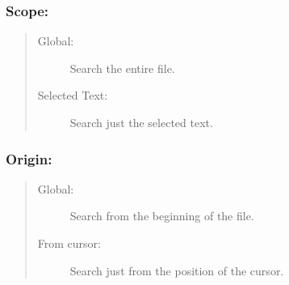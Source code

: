 \subsubsection{Scope:}
\begin{quote}
  \begin{footnotesize}
    \begin{description}
      \item[Global:]
        Search the entire file.
      \item[Selected Text:]
        Search just the selected text.
    \end{description}
  \end{footnotesize}
\end{quote}


\subsubsection{Origin:}
\begin{quote}
  \begin{footnotesize}
    \begin{description}
      \item[Global:]
        Search from the beginning of the file.
      \item[From cursor:]
        Search just from the position of the cursor.
    \end{description}
  \end{footnotesize}
\end{quote}

